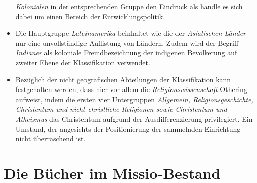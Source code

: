 \documentclass[a4paper,
fontsize=11pt,
oneside,
numbers=noperiodatend,
parskip=half-,
bibliography=totoc,
final
]{scrartcl}
\begin{document}
\begin{itemize}
  \emph{Kolonialen} in der entsprechenden Gruppe den Eindruck als handle
  es sich dabei um einen Bereich der Entwicklungspolitik.
\item
  Die Hauptgruppe \emph{Lateinamerika} beinhaltet wie die der
  \emph{Asiatischen Länder} nur eine unvollständige Auflistung von
  Ländern. Zudem wird der Begriff \emph{Indianer} als koloniale
  Fremdbezeichnung der indigenen Bevölkerung auf zweiter Ebene der
  Klassifikation verwendet.
\item
  Bezüglich der nicht geografischen Abteilungen der Klassifikation kann
  festgehalten werden, dass hier vor allem die
  \emph{Religionswissenschaft} Othering aufweist, indem die ersten vier
  Untergruppen \emph{Allgemein, Religionsgeschichte, Christentum und
  nicht-christliche Religionen sowie Christentum und Atheismus} das
  Christentum aufgrund der Ausdifferenzierung privilegiert. Ein Umstand,
  der angesichts der Positionierung der sammelnden Einrichtung nicht
  überraschend ist.
\end{itemize}

\hypertarget{die-buxfccher-im-missio-bestand}{%
\section{Die Bücher im Missio-Bestand}\label{die-buxfccher-im-missio-bestand}}
\end{document}
